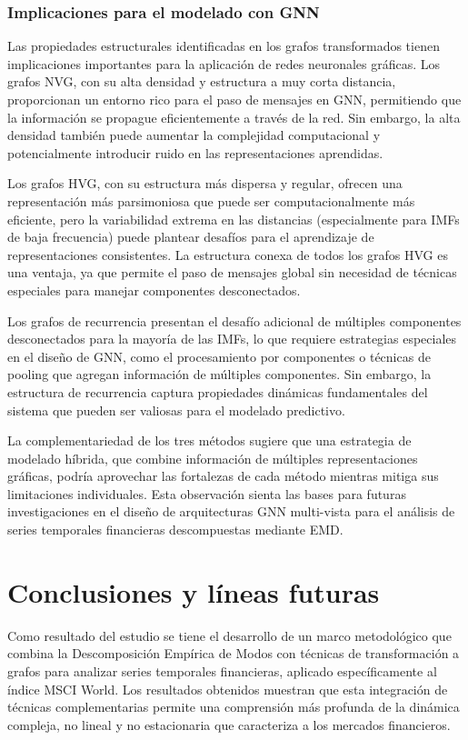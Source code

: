 \documentclass[11pt,a4paper]{article}
\begin{document}
\subsubsection{Implicaciones para el modelado con GNN}

Las propiedades estructurales identificadas en los grafos transformados tienen implicaciones importantes para la aplicación de redes neuronales gráficas. Los grafos NVG, con su alta densidad y estructura a muy corta distancia, proporcionan un entorno rico para el paso de mensajes en GNN, permitiendo que la información se propague eficientemente a través de la red. Sin embargo, la alta densidad también puede aumentar la complejidad computacional y potencialmente introducir ruido en las representaciones aprendidas.

Los grafos HVG, con su estructura más dispersa y regular, ofrecen una representación más parsimoniosa que puede ser computacionalmente más eficiente, pero la variabilidad extrema en las distancias (especialmente para IMFs de baja frecuencia) puede plantear desafíos para el aprendizaje de representaciones consistentes. La estructura conexa de todos los grafos HVG es una ventaja, ya que permite el paso de mensajes global sin necesidad de técnicas especiales para manejar componentes desconectados.

Los grafos de recurrencia presentan el desafío adicional de múltiples componentes desconectados para la mayoría de las IMFs, lo que requiere estrategias especiales en el diseño de GNN, como el procesamiento por componentes o técnicas de pooling que agregan información de múltiples componentes. Sin embargo, la estructura de recurrencia captura propiedades dinámicas fundamentales del sistema que pueden ser valiosas para el modelado predictivo.

La complementariedad de los tres métodos sugiere que una estrategia de modelado híbrida, que combine información de múltiples representaciones gráficas, podría aprovechar las fortalezas de cada método mientras mitiga sus limitaciones individuales. Esta observación sienta las bases para futuras investigaciones en el diseño de arquitecturas GNN multi-vista para el análisis de series temporales financieras descompuestas mediante EMD.


\section{Conclusiones y líneas futuras}
\label{conclfutu}

Como resultado del estudio se tiene el desarrollo de un marco metodológico que combina la Descomposición Empírica de Modos con técnicas de transformación a grafos para analizar series temporales financieras, aplicado específicamente al índice MSCI World. Los resultados obtenidos muestran que esta integración de técnicas complementarias permite una comprensión más profunda de la dinámica compleja, no lineal y no estacionaria que caracteriza a los mercados financieros.
\end{document}
